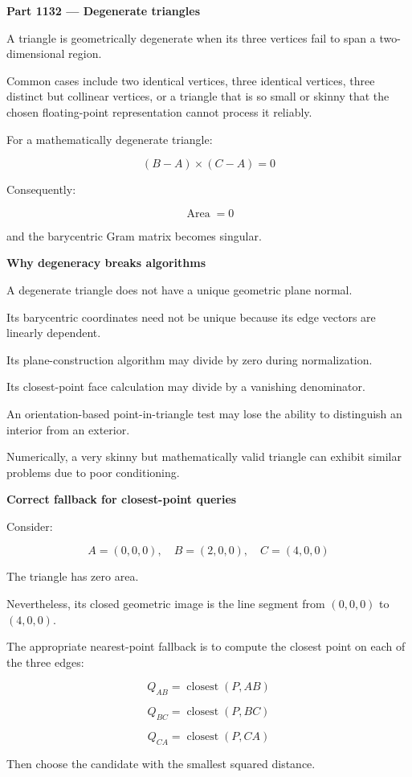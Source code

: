 \textbf{Part 1132 --- Degenerate triangles}

A triangle is geometrically degenerate when its three vertices fail to span a two-dimensional region.

Common cases include two identical vertices, three identical vertices, three distinct but collinear vertices, or a triangle that is so small or skinny that the chosen floating-point representation cannot process it reliably.

For a mathematically degenerate triangle:

\[
(B-A)\times(C-A)=0
\]

Consequently:

\[
\operatorname{Area}=0
\]

and the barycentric Gram matrix becomes singular.

\textbf{Why degeneracy breaks algorithms}

A degenerate triangle does not have a unique geometric plane normal.

Its barycentric coordinates need not be unique because its edge vectors are linearly dependent.

Its plane-construction algorithm may divide by zero during normalization.

Its closest-point face calculation may divide by a vanishing denominator.

An orientation-based point-in-triangle test may lose the ability to distinguish an interior from an exterior.

Numerically, a very skinny but mathematically valid triangle can exhibit similar problems due to poor conditioning.

\textbf{Correct fallback for closest-point queries}

Consider:

\[
A=(0,0,0),\quad B=(2,0,0),\quad C=(4,0,0)
\]

The triangle has zero area.

Nevertheless, its closed geometric image is the line segment from \((0,0,0)\) to \((4,0,0)\).

The appropriate nearest-point fallback is to compute the closest point on each of the three edges:

\[
Q_{AB}=\operatorname{closest}(P,AB)
\]

\[
Q_{BC}=\operatorname{closest}(P,BC)
\]

\[
Q_{CA}=\operatorname{closest}(P,CA)
\]

Then choose the candidate with the smallest squared distance.

